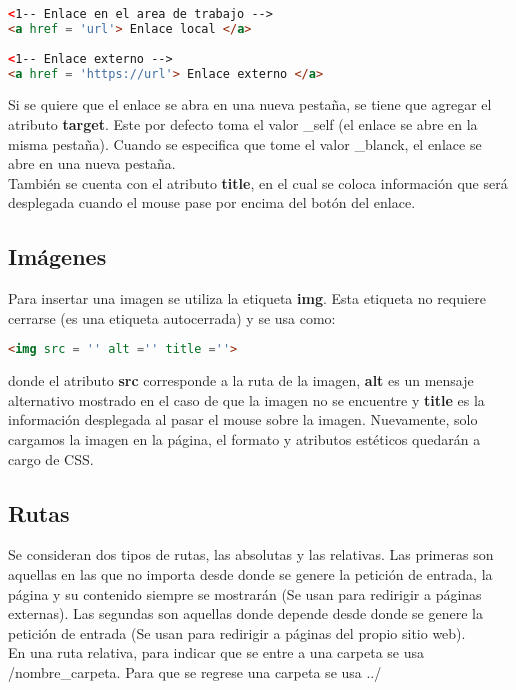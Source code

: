 \documentclass[10pt,oneside]{article}
\begin{document}
\begin{multicols}{2}
    \begin{lstlisting}[language=HTML]
<1-- Enlace en el area de trabajo -->
<a href = 'url'> Enlace local </a>
        
<1-- Enlace externo -->
<a href = 'https://url'> Enlace externo </a>
    \end{lstlisting}
    Si se quiere que el enlace se abra en una nueva pestaña, se tiene que agregar el atributo \textbf{target}. Este por defecto toma el valor \_self (el enlace se abre en la misma pestaña). Cuando se especifica que tome el valor \_blanck, el enlace se abre en una nueva pestaña.\\ \newline También se cuenta con el atributo \textbf{title}, en el cual se coloca información que será desplegada cuando el mouse pase por encima del botón del enlace. 
    
\subsection{Imágenes}

    Para insertar una imagen se utiliza la etiqueta \textbf{img}. Esta etiqueta no requiere cerrarse (es una etiqueta autocerrada) y se usa como: 

    \begin{lstlisting}[language=HTML]
<img src = '' alt ='' title =''>
    \end{lstlisting}

    donde el atributo \textbf{src} corresponde a la ruta de la imagen, \textbf{alt} es un mensaje alternativo mostrado en el caso de que la imagen no se encuentre y \textbf{title} es la información desplegada al pasar el mouse sobre la imagen. Nuevamente, solo cargamos la imagen en la página, el formato y atributos estéticos quedarán a cargo de CSS. 
    
\subsection{Rutas}

    Se consideran dos tipos de rutas, las absolutas y las relativas. Las primeras son aquellas en las que no importa desde donde se genere la petición de entrada, la página y su contenido siempre se mostrarán (Se usan para redirigir a páginas externas). Las segundas son aquellas donde depende desde donde se genere la petición de entrada (Se usan para redirigir a páginas del propio sitio web).\\ \newline En una ruta relativa, para indicar que se entre a una carpeta se usa /nombre\_carpeta. Para que se regrese una carpeta se usa ../   


\end{multicols}
\end{document}
